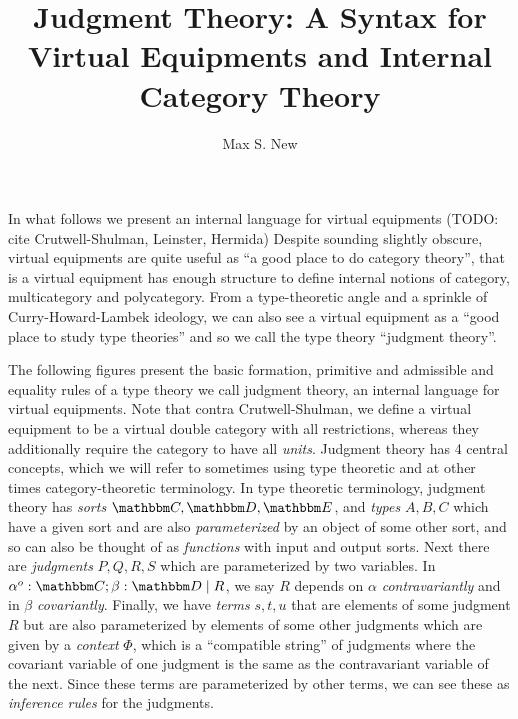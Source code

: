 \documentclass{article}
\begin{document}
\newtheorem{theorem}{Theorem}
\newtheorem{lemma}{Lemma}
\newtheorem{construction}{Construction}
\newtheorem{definition}{Definition}
\newcommand{\pto}{\nrightarrow}
\newcommand{\pfrom}{\nleftarrow}
\newcommand{\vcat}{\mathcal}
\newcommand{\cat}{\mathbbm}
\newcommand{\vtkmnd}{\mathbb{K}\text{Mod} (\vcat{V},T)}
\newcommand{\rmod}{\text{RMod}}
\newcommand{\lmod}{\text{LMod}}

\newcommand{\id}{\text{id}}
\newcommand{\for}{\text{for}\,}
\newcommand{\when}{\text{when}\,}
\newcommand{\sort}{\,\text{sort}}
\newcommand{\ctx}{\,\text{context}}
\newcommand{\pipe}{\mathrel{|}}

\title{Judgment Theory: A Syntax for Virtual Equipments and Internal Category Theory}
\author{Max S. New}

\maketitle

In what follows we present an internal language for virtual equipments
(TODO: cite Crutwell-Shulman, Leinster, Hermida)
%
Despite sounding slightly obscure, virtual equipments are quite useful
as ``a good place to do category theory'', that is a virtual equipment
has enough structure to define internal notions of category,
multicategory and polycategory.
%
From a type-theoretic angle and a sprinkle of Curry-Howard-Lambek
ideology, we can also see a virtual equipment as a ``good place to
study type theories'' and so we call the type theory ``judgment
theory''.

The following figures present the basic formation, primitive and
admissible and equality rules of a type theory we call judgment
theory, an internal language for virtual equipments.
%
Note that contra Crutwell-Shulman, we define a virtual equipment to be
a virtual double category with all restrictions, whereas they
additionally require the category to have all \emph{units}.
%
Judgment theory has 4 central concepts, which we will refer to
sometimes using type theoretic and at other times category-theoretic
terminology.
%
In type theoretic terminology, judgment theory has \emph{sorts} $\cat
C, \cat D, \cat E$, and \emph{types} $A,B,C$ which have a given sort
and are also \emph{parameterized} by an object of some other sort, and
so can also be thought of as \emph{functions} with input and output
sorts.
%
Next there are \emph{judgments} $P,Q,R,S$ which are parameterized by
two variables.
%
In $\alpha^o:\cat C;\beta : \cat D \pipe R$, we say $R$ depends on
$\alpha$ \emph{contravariantly} and in $\beta$ \emph{covariantly}.
%
Finally, we have \emph{terms} $s,t,u$ that are elements of some
judgment $R$ but are also parameterized by elements of some other
judgments which are given by a \emph{context} $\Phi$, which is a
``compatible string'' of judgments where the covariant variable of one
judgment is the same as the contravariant variable of the next.
%
Since these terms are parameterized by other terms, we can see these
as \emph{inference rules} for the judgments.
\end{document}
